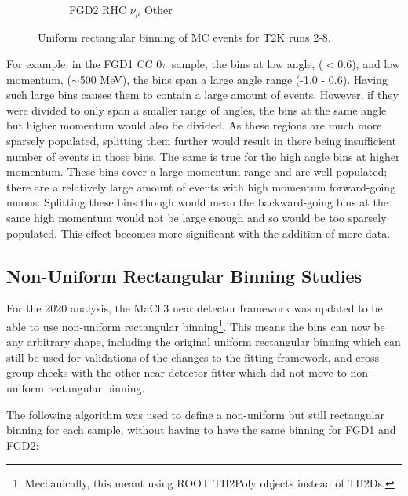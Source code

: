 \begin{figure}
\begin{subfigure}{.32\textwidth}
  \caption{FGD2 RHC $\nu_{\mu}$ Other}
  \label{fig:th2dFGD2_NuMuBkg_CCOther_in_AntiNu_Mode}
\end{subfigure}
\caption{Uniform rectangular binning of MC events for T2K runs 2-8.}
\label{fig:th2dbin}
\end{figure}

For example, in the FGD1 CC 0$\pi$ sample, the bins at low angle, ($<0.6$), and low momentum, ($\sim$500 MeV), the bins span a large angle range (-1.0 - 0.6). Having such large bins causes them to contain a large amount of events. However, if they were divided to only span a smaller range of angles, the bins at the same angle but higher momentum would also be divided. As these regions are much more sparsely populated, splitting them further would result in there being insufficient number of events in those bins. The same is true for the high angle bins at higher momentum. These bins cover a large momentum range and are well populated; there are a relatively large amount of events with high momentum forward-going muons. Splitting these bins though would mean the backward-going bins at the same high momentum would not be large enough and so would be too sparsely populated. This effect becomes more significant with the addition of more data.

\subsection{Non-Uniform Rectangular Binning Studies}\label{sec:nonrecbinning}
\enlargethispage{\baselineskip}
For the 2020 analysis, the MaCh3 near detector framework was updated to be able to use non-uniform rectangular binning\footnote{Mechanically, this meant using ROOT\cite{root} TH2Poly objects instead of TH2Ds.}. This means the bins can now be any arbitrary shape, including the original uniform rectangular binning which can still be used for validations of the changes to the fitting framework, and cross-group checks with the other near detector fitter which did not move to non-uniform rectangular binning.

The following algorithm was used to define a non-uniform but still rectangular binning for each sample, without having to have the same binning for FGD1 and FGD2:

